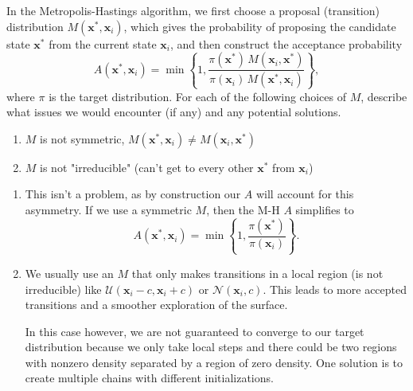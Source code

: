 \begin{exercise} %
    In the Metropolis-Hastings algorithm, we first choose a proposal (transition) distribution $M(\mathbf{x}^*, \mathbf{x}_i)$, which gives the probability of proposing the candidate state $\mathbf{x}^*$ from the current state $\mathbf{x}_i$, and then construct the acceptance probability
    \[
        A(\mathbf{x}^*, \mathbf{x}_i) = \min \left\{ 1, \frac{\pi(\mathbf{x}^*)\, M(\mathbf{x}_i, \mathbf{x}^*)}{\pi(\mathbf{x}_i)\, M(\mathbf{x}^*, \mathbf{x}_i)} \right\},
    \]
    where $\pi$ is the target distribution. For each of the following choices of $M$, describe what issues we would encounter (if any) and any potential solutions.

    \begin{enumerate}[label=(\alph*)]
        \item $M$ is not symmetric, $M(\mathbf{x}^*, \mathbf{x}_i)\neq M(\mathbf{x}_i, \mathbf{x}^*)$
        \item $M$ is not "irreducible" (can't get to every other $\mathbf{x}^*$ from $\mathbf{x}_i$)
    \end{enumerate}
\end{exercise}

\begin{solution}
    \begin{enumerate}[label=(\alph*)]
        \item This isn't a problem, as by construction our $A$ will account for this asymmetry. If we use a symmetric $M$, then the M-H $A$ simplifies to 
        \[
            A(\mathbf{x}^*, \mathbf{x}_i) = \min \left\{ 1, \frac{\pi(\mathbf{x}^*)}{\pi(\mathbf{x}_i)} \right\}.
        \]


        \item We usually use an $M$ that only makes transitions in a local region (is not irreducible) like $\mathcal{U}(\mathbf{x}_i-c,\mathbf{x}_i+c)$ or $\mathcal{N}(\mathbf{x}_i,c)$. This leads to more accepted transitions and a smoother exploration of the surface. 
        
        In this case however, we are not guaranteed to converge to our target distribution because we only take local steps and there could be two regions with nonzero density separated by a region of zero density. One solution is to create multiple chains with different initializations.
    \end{enumerate}
\end{solution}

